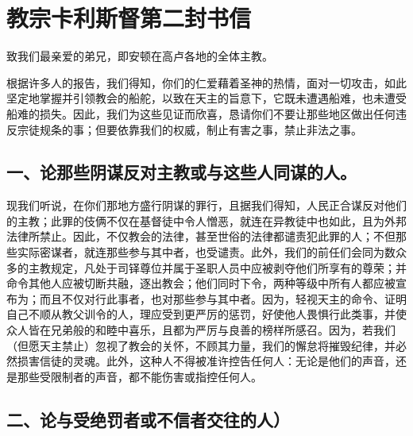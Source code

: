 
\section{教宗卡利斯督第二封书信}

\par

致我们最亲爱的弟兄，即安顿在高卢各地的全体主教。\par

根据许多人的报告，我们得知，你们的仁爱藉着圣神的热情，面对一切攻击，如此坚定地掌握并引领教会的船舵，以致在天主的旨意下，它既未遭遇船难，也未遭受船难的损失。因此，我们为这些见证而欣喜，恳请你们不要让那些地区做出任何违反宗徒规条的事；但要依靠我们的权威，制止有害之事，禁止非法之事。\par


\subsection{一、论那些阴谋反对主教或与这些人同谋的人。}

现我们听说，在你们那地方盛行阴谋的罪行，且据我们得知，人民正合谋反对他们的主教；此罪的伎俩不仅在基督徒中令人憎恶，就连在异教徒中也如此，且为外邦法律所禁止。因此，不仅教会的法律，甚至世俗的法律都谴责犯此罪的人；不但那些实际密谋者，就连那些参与其中者，也受谴责。此外，我们的前任们会同为数众多的主教规定，凡处于司铎尊位并属于圣职人员中应被剥夺他们所享有的尊荣；并命令其他人应被切断共融，逐出教会；他们同时下令，两种等级中所有人都应被宣布为；而且不仅对行此事者，也对那些参与其中者。因为，轻视天主的命令、证明自己不顺从教父训令的人，理应受到更严厉的惩罚，好使他人畏惧行此类事，并使众人皆在兄弟般的和睦中喜乐，且都为严厉与良善的榜样所感召。因为，若我们（但愿天主禁止）忽视了教会的关怀，不顾其力量，我们的懈怠将摧毁纪律，并必然损害信徒的灵魂。此外，这种人不得被准许控告任何人：无论是他们的声音，还是那些受限制者的声音，都不能伤害或指控任何人。\par


\subsection{二、论与受绝罚者或不信者交往的人）}

